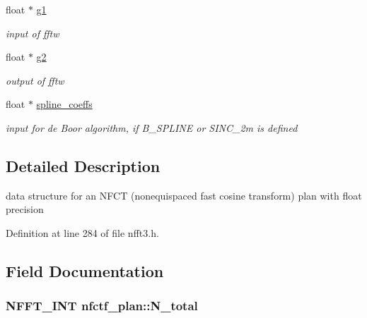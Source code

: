 \begin{DoxyCompactItemize}
\item 
\hypertarget{structnfctf__plan_a44a225766135ec7d1bbe8e8e7631faa3}{float $\ast$ \hyperlink{structnfctf__plan_a44a225766135ec7d1bbe8e8e7631faa3}{g1}}\label{structnfctf__plan_a44a225766135ec7d1bbe8e8e7631faa3}

\begin{DoxyCompactList}\small\item\em input of fftw \end{DoxyCompactList}\item 
\hypertarget{structnfctf__plan_a4a70d593fb1704dda85e2392c77ea3bc}{float $\ast$ \hyperlink{structnfctf__plan_a4a70d593fb1704dda85e2392c77ea3bc}{g2}}\label{structnfctf__plan_a4a70d593fb1704dda85e2392c77ea3bc}

\begin{DoxyCompactList}\small\item\em output of fftw \end{DoxyCompactList}\item 
\hypertarget{structnfctf__plan_a25a3208574495231141c9c407658f0cf}{float $\ast$ \hyperlink{structnfctf__plan_a25a3208574495231141c9c407658f0cf}{spline\-\_\-coeffs}}\label{structnfctf__plan_a25a3208574495231141c9c407658f0cf}

\begin{DoxyCompactList}\small\item\em input for de Boor algorithm, if B\-\_\-\-S\-P\-L\-I\-N\-E or S\-I\-N\-C\-\_\-2m is defined \end{DoxyCompactList}\end{DoxyCompactItemize}


\subsection{Detailed Description}
data structure for an N\-F\-C\-T (nonequispaced fast cosine transform) plan with float precision 

Definition at line 284 of file nfft3.\-h.



\subsection{Field Documentation}
\hypertarget{structnfctf__plan_ae8dd214d11d406cebe94d9e925605609}{
\subsubsection[{N\-\_\-total}]{\setlength{\rightskip}{0pt plus 5cm}N\-F\-F\-T\-\_\-\-I\-N\-T nfctf\-\_\-plan\-::\-N\-\_\-total}}\label{structnfctf__plan_ae8dd214d11d406cebe94d9e925605609}


